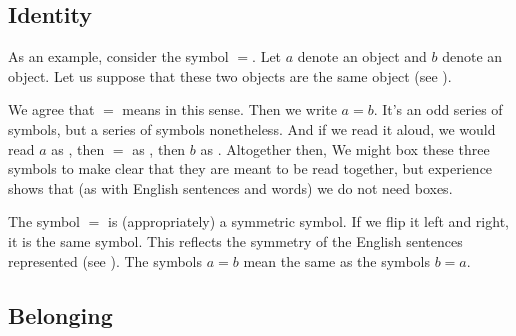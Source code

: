 \subsection*{Identity}

As an example, consider the symbol $=$.
Let $a$ denote an object and $b$ denote an object.
Let us suppose that these two objects are the same object (see ).
%  

We agree that $=$ means  in this sense.
Then we write $a = b$.
It's an odd series of symbols, but a series of symbols nonetheless.
And if we read it aloud, we would read $a$ as , then $=$ as , then $b$ as .
Altogether then, 
We might box these three symbols  to make clear that they are meant to be read together, but experience shows that (as with English sentences and words) we do not need boxes.


%  

The symbol $=$ is (appropriately) a symmetric symbol.
If we flip it left and right, it is the same symbol.
This reflects the symmetry of the English sentences represented (see ).
The symbols $a = b$ mean the same as the symbols $b = a$.


\subsection*{Belonging}


